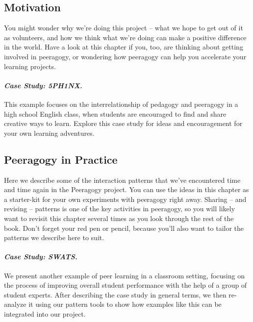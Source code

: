 \hypertarget{motivation}{%
\subsection{Motivation}\label{motivation}}

You might wonder why we're doing this project -- what we hope to get out
of it as volunteers, and how we think what we're doing can make a
positive difference in the world. Have a look at this chapter if you,
too, are thinking about getting involved in peeragogy, or wondering how
peeragogy can help you accelerate your learning projects.

\hypertarget{case-study-5ph1nx.}{%
\paragraph{\texorpdfstring{\emph{Case Study:
5PH1NX.}}{Case Study: 5PH1NX.}}\label{case-study-5ph1nx.}}

This example focuses on the interrelationship of pedagogy and peeragogy
in a high school English class, when students are encouraged to find and
share creative ways to learn. Explore this case study for ideas and
encouragement for your own learning adventures.

\hypertarget{peeragogy-in-practice}{%
\subsection{Peeragogy in Practice}\label{peeragogy-in-practice}}

Here we describe some of the interaction patterns that we've encountered
time and time again in the Peeragogy project. You can use the ideas in
this chapter as a starter-kit for your own experiments with peeragogy
right away. Sharing -- and revising -- patterns is one of the key
activities in peeragogy, so you will likely want to revisit this chapter
several times as you look through the rest of the book. Don't forget
your red pen or pencil, because you'll also want to tailor the patterns
we describe here to suit.

\hypertarget{case-study-swats.}{%
\paragraph{\texorpdfstring{\emph{Case Study:
SWATS.}}{Case Study: SWATS.}}\label{case-study-swats.}}

We present another example of peer learning in a classroom setting,
focusing on the process of improving overall student performance with
the help of a group of student experts. After describing the case study
in general terms, we then re-analyze it using our pattern tools to show
how examples like this can be integrated into our project.

